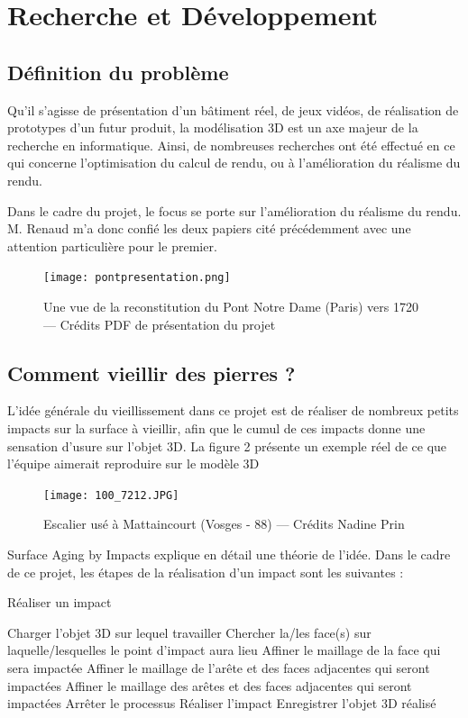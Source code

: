\documentclass[a4paper,french]{report}
\begin{document}
	\chapter{Recherche et Développement}
		\section{Définition du problème}
			Qu'il s'agisse de présentation d'un bâtiment réel, de jeux vidéos, de réalisation de prototypes d'un futur produit, la modélisation 3D est un axe majeur de la recherche en informatique. Ainsi, de nombreuses recherches ont été effectué en ce qui concerne l'optimisation du calcul de rendu, ou à l'amélioration du réalisme du rendu. \par 
			Dans le cadre du projet, le focus se porte sur l'amélioration du réalisme du rendu. M. Renaud m'a donc confié les deux papiers cité précédemment \cite{PPD01} \cite{Liris-6004} avec une attention particulière pour le premier. 
			\begin{figure}[h]
				\centering
				\texttt{[image: pontpresentation.png]}
				\caption{Une vue de la reconstitution du Pont Notre Dame (Paris) vers 1720 --- Crédits PDF de présentation du projet}
			\end{figure}
		\section{Comment vieillir des pierres ?}
			L'idée générale du vieillissement dans ce projet est de réaliser de nombreux petits impacts sur la surface à vieillir, afin que le cumul de ces impacts donne une sensation d'usure sur l'objet 3D. La figure 2 présente un exemple réel de ce que l'équipe aimerait reproduire sur le modèle 3D\par 
			\begin{figure}[h]
				\centering
				\texttt{[image: 100\_7212.JPG]}
				\caption{Escalier usé à Mattaincourt (Vosges - 88) --- Crédits Nadine Prin}
			\end{figure}
			Surface Aging by Impacts \cite{PPD01} explique en détail une théorie de l'idée. Dans le cadre de ce projet, les étapes de la réalisation d'un impact sont les suivantes : 
			\begin{algorithm}[H]
				\caption{Réaliser un impact}
				\begin{algorithmic}[1]
					\STATE Charger l'objet 3D sur lequel travailler
					\REPEAT
						\REPEAT
							\STATE Chercher la/les face(s) sur laquelle/lesquelles le point d'impact aura lieu
								\STATE Affiner le maillage de la face qui sera impactée
								\STATE Affiner le maillage de l'arête et des faces adjacentes qui seront impactées
								\STATE Affiner le maillage des arêtes et des faces adjacentes qui seront impactées
							\ELSE
								\STATE Arrêter le processus
							\ENDIF
						\STATE Réaliser l'impact
					\STATE Enregistrer l'objet 3D réalisé
				\end{algorithmic}
			\end{algorithm}
			
\end{document}
